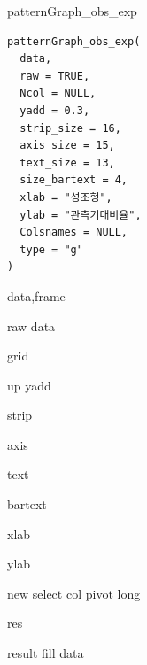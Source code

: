 \documentclass[a4paper]{book}
\begin{document}
%
\begin{Description}
patternGraph\_obs\_exp
\end{Description}
%
\begin{Usage}
\begin{verbatim}
patternGraph_obs_exp(
  data,
  raw = TRUE,
  Ncol = NULL,
  yadd = 0.3,
  strip_size = 16,
  axis_size = 15,
  text_size = 13,
  size_bartext = 4,
  xlab = "성조형",
  ylab = "관측기대비율",
  Colsnames = NULL,
  type = "g"
)
\end{verbatim}
\end{Usage}
%
\begin{Arguments}
\begin{ldescription}
\item[\code{data}] data,frame

\item[\code{raw}] raw data

\item[\code{Ncol}] grid

\item[\code{yadd}] up yadd

\item[\code{strip\_size}] strip

\item[\code{axis\_size}] axis

\item[\code{text\_size}] text

\item[\code{size\_bartext}] bartext

\item[\code{xlab}] xlab

\item[\code{ylab}] ylab

\item[\code{Colsnames}] new select col pivot long

\item[\code{type}] res
\end{ldescription}
\end{Arguments}
%
\begin{Value}
result fill data
\end{Value}
%
\end{document}
